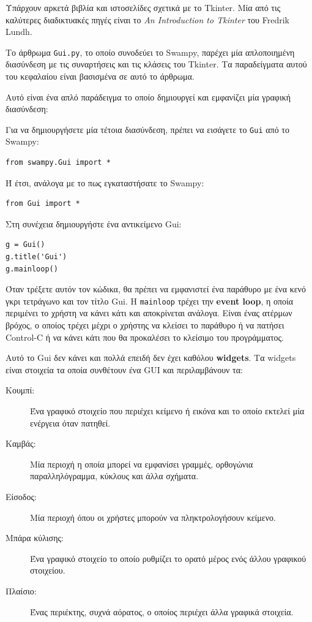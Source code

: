 \documentclass[10pt]{book}
\begin{document}
Υπάρχουν αρκετά βιβλία και ιστοσελίδες σχετικά με το Tkinter.  Μία από τις 
καλύτερες διαδικτυακές πηγές είναι το {\em An Introduction to Tkinter} του  
Fredrik Lundh.

Το άρθρωμα {\tt Gui.py}, το οποίο συνοδεύει το Swampy, παρέχει μία απλοποιημένη διασύνδεση με
τις συναρτήσεις και τις κλάσεις του Tkinter. Τα παραδείγματα αυτού του κεφαλαίου είναι βασισμένα
σε αυτό το άρθρωμα.

Αυτό είναι ένα απλό παράδειγμα το οποίο δημιουργεί και εμφανίζει μία γραφική διασύνδεση:

Για να δημιουργήσετε μία τέτοια διασύνδεση, πρέπει να εισάγετε το {\tt Gui} από
το Swampy:
%
\begin{verbatim}
from swampy.Gui import *
\end{verbatim}
%
Ή έτσι, ανάλογα με το πως εγκαταστήσατε το Swampy:
%
\begin{verbatim}
from Gui import *
\end{verbatim}
%
Στη συνέχεια δημιουργήστε ένα αντικείμενο Gui:
%
\begin{verbatim}
g = Gui()
g.title('Gui')
g.mainloop()
\end{verbatim}
%
Όταν τρέξετε αυτόν τον κώδικα, θα πρέπει να εμφανιστεί ένα παράθυρο με ένα κενό γκρι 
τετράγωνο και τον τίτλο {\sf Gui}.  Η {\tt mainloop} τρέχει την {\bf event loop}, η οποία
περιμένει το χρήστη να κάνει κάτι και αποκρίνεται ανάλογα. Είναι ένας ατέρμων βρόχος, ο
οποίος τρέχει μέχρι ο χρήστης να κλείσει το παράθυρο ή να πατήσει  Control-C  ή να κάνει
κάτι που θα προκαλέσει το κλείσιμο του προγράμματος.

Αυτό το Gui δεν κάνει και πολλά επειδή δεν έχει καθόλου {\bf widgets}.   
Τα widgets είναι στοιχεία τα οποία συνθέτουν ένα  GUI και περιλαμβάνουν τα:

 
\begin{description}

\item[Κουμπί:] Ένα γραφικό στοιχείο που περιέχει κείμενο ή εικόνα και το οποίο 
εκτελεί μία ενέργεια όταν πατηθεί.

\item[Καμβάς:] Μία περιοχή η οποία μπορεί να εμφανίσει γραμμές, ορθογώνια παραλληλόγραμμα, 
κύκλους και άλλα σχήματα.

\item[Είσοδος:] Μία περιοχή όπου οι χρήστες μπορούν να πληκτρολογήσουν κείμενο.

\item[Μπάρα κύλισης:] Ένα γραφικό στοιχείο το οποίο ρυθμίζει το ορατό μέρος ενός άλλου 
γραφικού στοιχείου.

\item[Πλαίσιο:] Ένας περιέκτης, συχνά αόρατος, ο οποίος περιέχει άλλα γραφικά στοιχεία.

\end{description}
\end{document}
